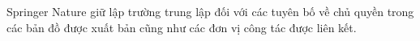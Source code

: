 \printbibliography[title={Tài liệu tham khảo}]

\vspace{18pt}

 Springer Nature giữ lập trường trung lập đối với các tuyên bố về chủ quyền trong các bản đồ được xuất bản cũng như các đơn vị công tác được liên kết.
